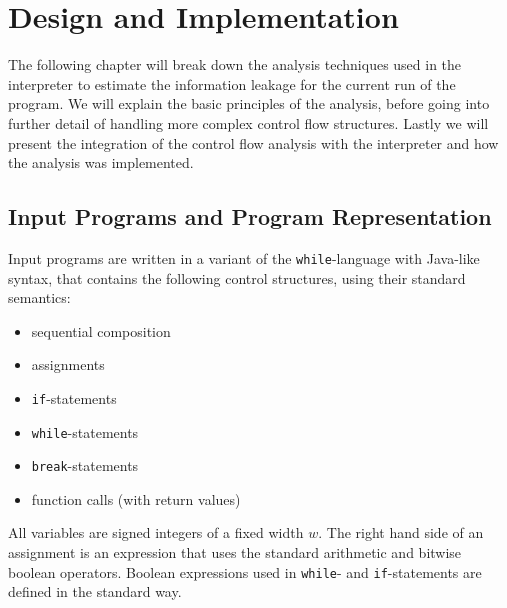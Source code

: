 \chapter{Design and Implementation}\label{sec:impl}

The following chapter will break down the analysis techniques used in the interpreter to estimate the information leakage for the current run of the program. We will explain the basic principles of the analysis, before going into further detail of handling more complex control flow structures. Lastly we will present the integration of the control flow analysis with the interpreter and how the analysis was implemented.


\section{Input Programs and Program Representation}

\begin{comment}

\begin{itemize}
    \item \question{Wie werden Eingabeparameter in Grammatiken angegeben?}
    \item \question{""Standard semantics""?}
    \item \question{`High level' Sprache oder Instructions, die in CFG verwendet werden? (Phi in Grammatik?)}
    \item \note{`Erklärung' statt Grammatik zur Definition der Eingabesprache}
    \item \note{Refer to: Clark+Hunt `Quantified Interference for a While Language'}
\end{itemize}
\end{comment}

Input programs are written in a variant of the \texttt{while}-language with Java-like syntax, that contains the following control structures, using their standard semantics:
\begin{itemize}
    \setlength\itemsep{0em}
    \item sequential composition
    \item assignments
    \item \texttt{if}-statements
    \item \texttt{while}-statements
    \item \texttt{break}-statements
    \item function calls (with return values)
\end{itemize}
All variables are signed integers of a fixed width $w$. The right hand side of an assignment is an expression that uses the standard arithmetic and bitwise boolean operators. Boolean expressions used in \texttt{while}- and \texttt{if}-statements are defined in the standard way.

